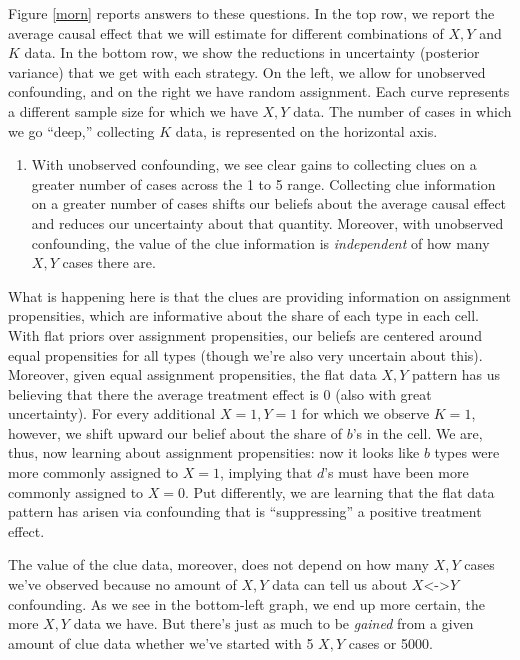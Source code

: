 \documentclass[
  12pt,
]{book}
\providecommand{\tightlist}{%
  \setlength{\itemsep}{0pt}\setlength{\parskip}{0pt}}
\begin{document}
Figure \ref{morn} reports answers to these questions. In the top row, we report the average causal effect that we will estimate for different combinations of \(X,Y\) and \(K\) data. In the bottom row, we show the reductions in uncertainty (posterior variance) that we get with each strategy. On the left, we allow for unobserved confounding, and on the right we have random assignment. Each curve represents a different sample size for which we have \(X,Y\) data. The number of cases in which we go ``deep,'' collecting \(K\) data, is represented on the horizontal axis.

\begin{enumerate}
\def\labelenumi{\arabic{enumi}.}
\tightlist
\item
  With unobserved confounding, we see clear gains to collecting clues on a greater number of cases across the 1 to 5 range. Collecting clue information on a greater number of cases shifts our beliefs about the average causal effect and reduces our uncertainty about that quantity. Moreover, with unobserved confounding, the value of the clue information is \emph{independent} of how many \(X,Y\) cases there are.
\end{enumerate}

What is happening here is that the clues are providing information on assignment propensities, which are informative about the share of each type in each cell. With flat priors over assignment propensities, our beliefs are centered around equal propensities for all types (though we're also very uncertain about this). Moreover, given equal assignment propensities, the flat data \(X,Y\) pattern has us believing that there the average treatment effect is 0 (also with great uncertainty). For every additional \(X=1, Y=1\) for which we observe \(K=1\), however, we shift upward our belief about the share of \(b\)'s in the cell. We are, thus, now learning about assignment propensities: now it looks like \(b\) types were more commonly assigned to \(X=1\), implying that \(d\)'s must have been more commonly assigned to \(X=0\). Put differently, we are learning that the flat data pattern has arisen via confounding that is ``suppressing'' a positive treatment effect.

The value of the clue data, moreover, does not depend on how many \(X,Y\) cases we've observed because no amount of \(X,Y\) data can tell us about \(X\)\textless-\textgreater{}\(Y\) confounding. As we see in the bottom-left graph, we end up more certain, the more \(X, Y\) data we have. But there's just as much to be \emph{gained} from a given amount of clue data whether we've started with 5 \(X,Y\) cases or 5000.
\end{document}
